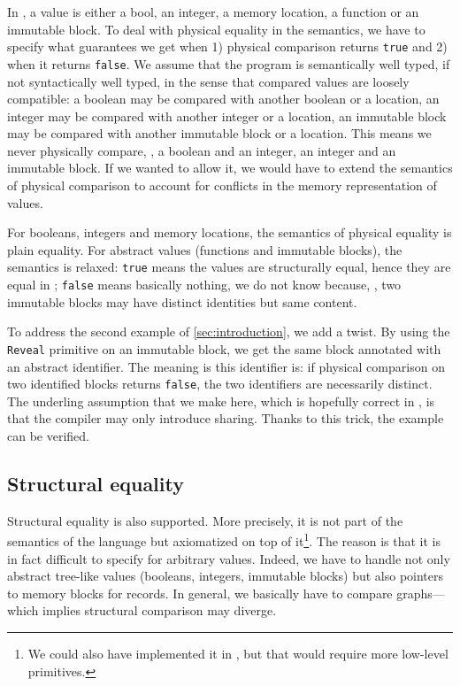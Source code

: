 In \Zoo, a value is either a bool, an integer, a memory location, a function or an immutable block.
To deal with physical equality in the semantics, we have to specify what guarantees we get when 1) physical comparison returns \texttt{true} and 2) when it returns \texttt{false}.
We assume that the program is semantically well typed, if not syntactically well typed, in the sense that compared values are loosely compatible: a boolean may be compared with another boolean or a location, an integer may be compared with another integer or a location, an immutable block may be compared with another immutable block or a location.
This means we never physically compare, \eg, a boolean and an integer, an integer and an immutable block.
If we wanted to allow it, we would have to extend the semantics of physical comparison to account for conflicts in the memory representation of values.

For booleans, integers and memory locations, the semantics of physical equality is plain equality.
For abstract values (functions and immutable blocks), the semantics is relaxed: \texttt{true} means the values are structurally equal, hence they are equal in \Coq; \texttt{false} means basically nothing, we do not know because, \eg, two immutable blocks may have distinct identities but same content.

To address the second example of \cref{sec:introduction}, we add a twist.
By using the \texttt{Reveal} primitive on an immutable block, we get the same block annotated with an abstract identifier.
The meaning is this identifier is: if physical comparison on two identified blocks returns \texttt{false}, the two identifiers are necessarily distinct.
The underling assumption that we make here, which is hopefully correct in \OCaml, is that the compiler may only introduce sharing.
Thanks to this trick, the example can be verified.

\subsection{Structural equality}

Structural equality is also supported.
More precisely, it is not part of the semantics of the language but axiomatized on top of it\footnote{We could also have implemented it in \Zoo, but that would require more low-level primitives.}.
The reason is that it is in fact difficult to specify for arbitrary values.
Indeed, we have to handle not only abstract tree-like values (booleans, integers, immutable blocks) but also pointers to memory blocks for records.
In general, we basically have to compare graphs---which implies structural comparison may diverge.

